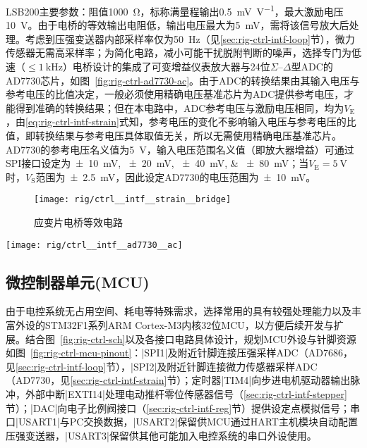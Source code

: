 LSB200主要参数：阻值\SI{1000}{\ohm}，标称满量程输出\SI{0.5}{\milli\volt\per\volt}，最大激励电压\SI{10}{\volt}。由于电桥的等效输出电阻低，输出电压最大为\SI{5}{\milli\volt}，需将该信号放大后处理。考虑到压强变送器内部采样率仅为\SI{50}{\hertz}（见\ref{sec:rig-ctrl-intf-loop}节），微力传感器无需高采样率；为简化电路，减小可能干扰脱附判断的噪声，选择专门为低速（$\leq\SI{1}{\kilo\hertz}$）电桥设计的集成了可变增益仪表放大器与24位$\Sigma$--$\Delta$型ADC的AD7730芯片，如图~\ref{fig:rig-ctrl-ad7730-ac}。由于ADC的转换结果由其输入电压与参考电压的比值决定，一般必须使用精确电压基准芯片为ADC提供参考电压，才能得到准确的转换结果；但在本电路中，ADC参考电压与激励电压相同，均为$V_{\mathrm{E}}$，由\eqref{eq:rig-ctrl-intf-strain}式知，参考电压的变化不影响输入电压与参考电压的比值，即转换结果与参考电压具体取值无关，所以无需使用精确电压基准芯片。AD7730的参考电压名义值为\SI{5}{\volt}，输入电压范围名义值（即放大器增益）可通过SPI接口设定为\SIlist[list-separator={、},list-final-separator={、或}]{\pm 10;\pm 20;\pm 40;\pm 80}{\milli\volt}；当$V_{\mathrm{E}} = \SI{5}{\volt}$时，$V_{\mathrm{S}}$范围为\SI{\pm 2.5}{\milli\volt}，因此设定AD7730的电压范围为\SI{\pm 10}{\milli\volt}。

\begin{figure}[p]
\centering
\texttt{[image: rig/ctrl\_\_intf\_\_strain\_\_bridge]}
\caption{应变片电桥等效电路}
\label{fig:rig-ctrl-strain-bridge}
\end{figure}

\begin{sidewaysfigure}[p]
\centering
\texttt{[image: rig/ctrl\_\_intf\_\_ad7730\_\_ac]}
\caption{AD7730电桥接口原理图}
\label{fig:rig-ctrl-ad7730-ac}
\end{sidewaysfigure}


\clearpage


\subsection{微控制器单元(MCU)}\label{sec:rig-ctrl-mcu}

由于电控系统无占用空间、耗电等特殊需求，选择常用的具有较强处理能力以及丰富外设的STM32F1系列ARM Cortex-M3内核32位MCU，以方便后续开发与扩展。结合图~\ref{fig:rig-ctrl-sch}以及各接口电路具体设计，规划MCU外设与针脚资源如图~\ref{fig:rig-ctrl-mcu-pinout}：\bverb|SPI1|及附近针脚连接压强采样ADC（AD7686，见\ref{sec:rig-ctrl-intf-loop}节），\bverb|SPI2|及附近针脚连接微力传感器采样ADC（AD7730，见\ref{sec:rig-ctrl-intf-strain}节）；定时器\bverb|TIM4|向步进电机驱动器输出脉冲，外部中断\bverb|EXTI14|处理电动推杆零位传感器信号（\ref{sec:rig-ctrl-intf-stepper}节）；\bverb|DAC|向电子比例阀接口（\ref{sec:rig-ctrl-intf-reg}节）提供设定点模拟信号；串口\bverb|USART1|与PC交换数据，\bverb|USART2|保留供MCU通过HART主机模块自动配置压强变送器，\bverb|USART3|保留供其他可能加入电控系统的串口外设使用。

